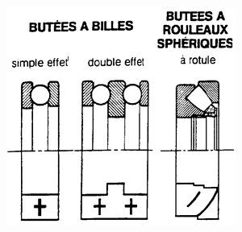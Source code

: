 \documentclass[10pt,oneside]{article}
\begin{document}
\begin{minipage}[c]{.2\linewidth}
\begin{center}
\includegraphics[width=.95\textwidth]{png/roulements3}
\end{center}
\end{minipage}
\end{document}
